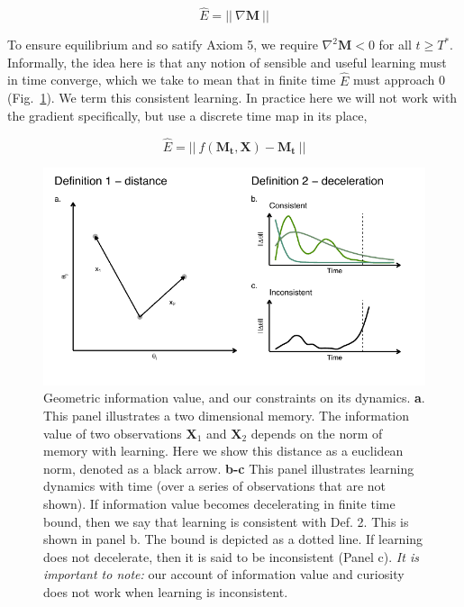 \begin{equation}
	\label{eq:E_norm}
	\hat E = || \ \nabla \mathbf{M} \ ||
\end{equation}

To ensure equilibrium and so satify Axiom 5, we require $\nabla^2 \mathbf{M} < 0$ for all $ t \ge T^*$. Informally, the idea here is that any notion of sensible and useful learning must in time converge, which we take to mean that in finite time $\hat E$ must approach 0 (Fig.~\ref{fig:cartoon}). We term this consistent learning. In practice here we will not work with the gradient specifically, but use a discrete time map in its place,

\begin{equation}
	\label{eq:E_norm_discrete}
	\hat E = || \ f(\mathbf{M_t},\mathbf{X}) - \mathbf{M_t} \ ||
\end{equation}

\begin{figure}
	\begin{fullwidth}
	\includegraphics[width=0.7\linewidth]{img/cartoon.pdf} 
	\caption{Geometric information value, and our constraints on its dynamics. 
	\textbf{a}. This panel illustrates a two dimensional memory. The information value of two observations $\mathbf{X}_1$ and $\mathbf{X}_2$ depends on the norm of memory with learning. Here we show this distance as a euclidean norm, denoted as a black arrow.
	\textbf{b-c} This panel illustrates learning dynamics with time (over a series of observations that are not shown). If information value becomes decelerating in finite time bound, then we say that learning is consistent with Def. 2. This is shown in panel b. The bound is depicted as a dotted line. If learning does not decelerate, then it is said to be inconsistent (Panel c). \textit{It is important to note:} our account of information value and curiosity does not work when learning is inconsistent.
  	}
	\label{fig:cartoon} 
	\end{fullwidth}
\end{figure}

